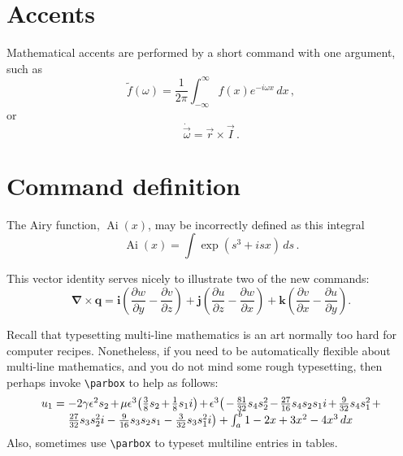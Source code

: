\documentclass[a4paper]{article}
\begin{document}
    
    
    
    
    
    \section{Accents}
    
    Mathematical accents are performed by a short command with one 
    argument, such as
    \[
        \tilde f(\omega)=\frac{1}{2\pi}
        \int_{-\infty}^\infty f(x)e^{-i\omega x}\,dx\,,
    \]
    or
    \[
        \dot{\vec \omega}=\vec r\times\vec I\,.
    \]
    
    
    
    
    
    \section{Command definition}
    
    \newcommand{\Ai}{\operatorname{Ai}} 
    The Airy function, $\Ai(x)$, may be incorrectly defined as this 
    integral
    \[
        \Ai(x)=\int\exp(s^3+isx)\,ds\,.
    \]
    
    \newcommand{\D}[2]{\frac{\partial #2}{\partial #1}}
    \newcommand{\DD}[2]{\frac{\partial^2 #2}{\partial #1^2}}
    \renewcommand{\vec}[1]{\boldsymbol{#1}}
    
    This vector identity serves nicely to illustrate two of the new 
    commands:
    \[
        \vec\nabla\times\vec q
        =\vec i\left(\D yw-\D zv\right)
        +\vec j\left(\D zu-\D xw\right)
        +\vec k\left(\D xv-\D yu\right).
    \]
    
    Recall that typesetting multi-line mathematics is an art normally too hard for computer recipes.  Nonetheless, if you need to be automatically flexible about multi-line mathematics, and you do not mind some rough typesetting, then perhaps invoke \verb|\parbox| to help as follows: 
    \newcommand{\parmath}[2][0.8\linewidth]{\parbox[t]{#1}%
        {\raggedright\linespread{1.2}\selectfont\(#2\)}}
    \[
    u_1=\parmath{ -2 \gamma  \epsilon^{2} s_{2}+\mu  \epsilon^{3} \big( \frac{3}{8} s_{2}+\frac{1}{8} s_{1} i\big)+\epsilon^{3} \big( -\frac{81}{32} s_{4} s_{2}^{2}-\frac{27}{16} s_{4} s_{2} s_{1} i+\frac{9}{32} s_{4} s_{1}^{2}+\frac{27}{32} s_{3} s_{2}^{2} i-\frac{9}{16} s_{3} s_{2} s_{1}-\frac{3}{32} s_{3} s_{1}^{2} i\big) +\int_a^b 1-2x+3x^2-4x^3\,dx }
    \]
    Also, sometimes use \verb|\parbox| to typeset multiline entries in tables.
    
\end{document}
